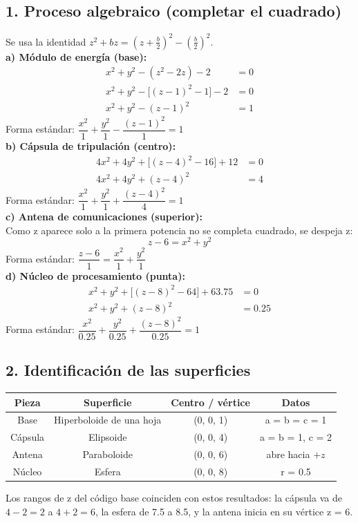 \documentclass[50pt]{article}
\begin{document}
\subsection*{1. Proceso algebraico (completar el cuadrado)}
Se usa la identidad $z^2 + bz = \left(z + \tfrac{b}{2}\right)^2 - \left(\tfrac{b}{2}\right)^2$.\\[0.3em]
\textbf{a) Módulo de energía (base):}
\begin{align*}
x^2 + y^2 - (z^2 - 2z) - 2 &= 0\\
x^2 + y^2 - \big[(z-1)^2 - 1\big] - 2 &= 0\\
x^2 + y^2 - (z-1)^2 &= 1
\end{align*}
Forma estándar: $\dfrac{x^2}{1} + \dfrac{y^2}{1} - \dfrac{(z-1)^2}{1} = 1$\\[0.5em]
\textbf{b) Cápsula de tripulación (centro):}
\begin{align*}
4x^2 + 4y^2 + \big[(z-4)^2 - 16\big] + 12 &= 0\\
4x^2 + 4y^2 + (z-4)^2 &= 4
\end{align*}
Forma estándar: $\dfrac{x^2}{1} + \dfrac{y^2}{1} + \dfrac{(z-4)^2}{4} = 1$\\[0.5em]
\textbf{c) Antena de comunicaciones (superior):}\\
Como z aparece solo a la primera potencia no se completa cuadrado, se despeja z:
\[
z - 6 = x^2 + y^2
\]
Forma estándar: $\dfrac{z-6}{1} = \dfrac{x^2}{1} + \dfrac{y^2}{1}$\\[0.5em]
\textbf{d) Núcleo de procesamiento (punta):}
\begin{align*}
x^2 + y^2 + \big[(z-8)^2 - 64\big] + 63.75 &= 0\\
x^2 + y^2 + (z-8)^2 &= 0.25
\end{align*}
Forma estándar: $\dfrac{x^2}{0.25} + \dfrac{y^2}{0.25} + \dfrac{(z-8)^2}{0.25} = 1$
\subsection*{2. Identificación de las superficies}
\begin{center}
\begin{tabular}{|c|c|c|c|}
\hline
\textbf{Pieza} & \textbf{Superficie} & \textbf{Centro / vértice} & \textbf{Datos} \\ \hline
Base & Hiperboloide de una hoja & (0, 0, 1) & a = b = c = 1 \\ \hline
Cápsula & Elipsoide & (0, 0, 4) & a = b = 1, c = 2 \\ \hline
Antena & Paraboloide & (0, 0, 6) & abre hacia $+z$ \\ \hline
Núcleo & Esfera & (0, 0, 8) & r = 0.5 \\ \hline
\end{tabular}
\end{center}
Los rangos de z del código base coinciden con estos resultados: la cápsula va de $4-2=2$ a $4+2=6$, la esfera de 7.5 a 8.5, y la antena inicia en su vértice z = 6.
\end{document}
